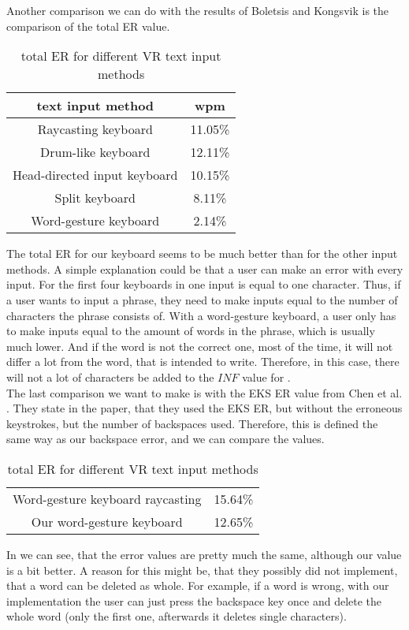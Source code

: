 Another comparison we can do with the results of Boletsis and Kongsvik \cite{Boletsis2019ControllerbasedTT} is the comparison of the total ER value.
\begin{table}[H]
    \centering
    \caption{total ER for different VR text input methods}
    \begin{tabular}{cc} \toprule
        text input method&wpm\\ \midrule
        Raycasting keyboard& 11.05\%\\
        Drum-like keyboard& 12.11\%\\
        Head-directed input keyboard& 10.15\%\\
        Split keyboard& 8.11\%\\
        Word-gesture keyboard& 2.14\%\\
        \bottomrule
    \end{tabular}
    \label{tab:total_er_compare}
\end{table}
The total ER for our keyboard seems to be much better than for the other input methods. A simple explanation could be that a user can make an error with every input. For the first four keyboards in  one input is equal to one character. Thus, if a user wants to input a phrase, they need to make inputs equal to the number of characters the phrase consists of. With a word-gesture keyboard, a user only has to make inputs equal to the amount of words in the phrase, which is usually much lower. And if the word is not the correct one, most of the time, it will not differ a lot from the word, that is intended to write. Therefore, in this case, there will not a lot of characters be added to the $INF$ value for .\\

The last comparison we want to make is with the EKS ER value from Chen et al. \cite{10.1145/3290607.3312762}. They state in the paper, that they used the EKS ER, but without the erroneous keystrokes, but the number of backspaces used. Therefore, this is defined the same way as our backspace error, and we can compare the values.
\begin{table}[H]
    \centering
    \caption{total ER for different VR text input methods}
    \begin{tabular}{cc} \toprule
        Word-gesture keyboard raycasting&15.64\%\\
        Our word-gesture keyboard&12.65\%\\
        \bottomrule
    \end{tabular}
    \label{tab:error_backspace_compare}
\end{table}
In  we can see, that the error values are pretty much the same, although our value is a bit better. A reason for this might be, that they possibly did not implement, that a word can be deleted as whole. For example, if a word is wrong, with our implementation the user can just press the backspace key once and delete the whole word (only the first one, afterwards it deletes single characters).\\


